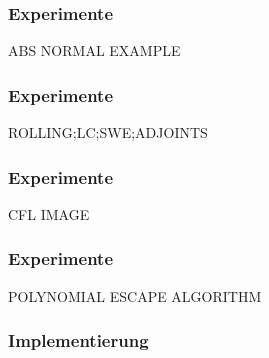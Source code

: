 \appendix
{}
\setcounter{finalframe}{\value{framenumber}}

\begin{frame}[<+->]
\frametitle{Experimente}
  ABS NORMAL EXAMPLE
\end{frame}

\begin{frame}[<+->]
\frametitle{Experimente}
  ROLLING;LC;SWE;ADJOINTS
\end{frame}
\begin{frame}[<+->]
\frametitle{Experimente}
CFL IMAGE
\end{frame}
\begin{frame}[<+->]
\frametitle{Experimente}
POLYNOMIAL ESCAPE ALGORITHM
\end{frame}


\begin{frame}[fragile]
\frametitle{Implementierung}
\cite{openblas}
\cite{armadillo}
\cite{ADOLCmanual}
\cite{boeck14}
\end{frame}

\setcounter{framenumber}{\value{finalframe}}
